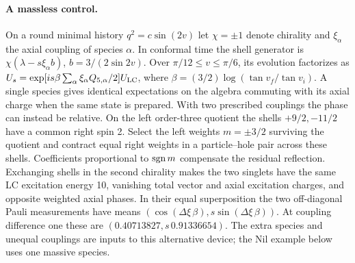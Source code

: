 \paragraph{A massless control.}
On a round minimal history \(q^2=c\sin(2v)\) let \(\chi=\pm1\) denote chirality and \(\xi_\alpha\) the axial coupling of species \(\alpha\). In conformal time the shell generator is \(\chi(\lambda-s\xi_\alpha b)\), \(b=3/(2\sin 2v)\). Over \(\pi/12\le v\le\pi/6\), its evolution factorizes as \(U_s=\exp[is\beta\sum_\alpha\xi_\alpha Q_{5,\alpha}/2]U_{\mathrm{LC}}\), where \(\beta=(3/2)\log(\tan v_f/\tan v_i)\). A single species gives identical expectations on the algebra commuting with its axial charge when the same state is prepared. With two prescribed couplings the phase can instead be relative. On the left order-three quotient the shells \(+9/2,-11/2\) have a common right spin 2. Select the left weights \(m=\pm3/2\) surviving the quotient and contract equal right weights in a particle--hole pair across these shells. Coefficients proportional to \(\operatorname{sgn} m\) compensate the residual reflection. Exchanging shells in the second chirality makes the two singlets have the same LC excitation energy 10, vanishing total vector and axial excitation charges, and opposite weighted axial phases. In their equal superposition the two off-diagonal Pauli measurements have means \((\cos(\Delta\xi\,\beta),s\sin(\Delta\xi\,\beta))\). At coupling difference one these are \((0.40713827,s\,0.91336654)\). The extra species and unequal couplings are inputs to this alternative device; the Nil example below uses one massive species.

